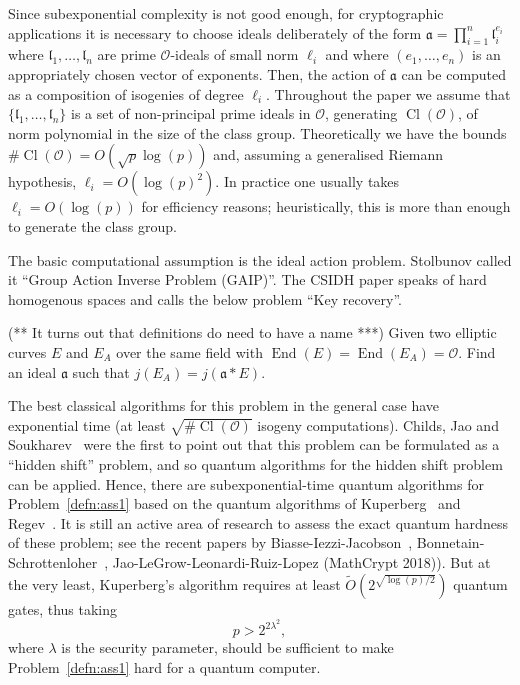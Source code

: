 \documentclass{llncs}
\newcommand{\OO}{\mathcal{O}}
\DeclareMathOperator{\End}{End}
\DeclareMathOperator{\Cl}{Cl}
\renewcommand{\a}{\mathfrak{a}}
\renewcommand{\l}{\mathfrak{l}}
\begin{document}
Since subexponential complexity is not good enough, for cryptographic applications it is necessary to choose ideals deliberately of the form $\a = \prod_{i=1}^n \l_i^{e_i}$ where $\l_1, \dots, \l_n$ are prime $\OO$-ideals of small norm $\ell_i$ and where $(e_1, \dots, e_n)$ is an appropriately chosen vector of exponents.
Then, the action of $\a$ can be computed as a composition of isogenies of degree $\ell_i$.
Throughout the paper we assume that $\{ \l_1, \dots, \l_n \}$ is a set of non-principal prime ideals in $\OO$, generating $\Cl(\OO)$, of norm polynomial in the size of the class group.
Theoretically we have the bounds $\#\Cl(\OO) = O( \sqrt{p} \log(p) )$ and, assuming a generalised Riemann hypothesis, $\ell_i = O( \log(p)^2 )$.
In practice one usually takes $\ell_i=O(\log(p))$ for efficiency reasons; heuristically, this is more than enough to generate the class group.

The basic computational assumption is the ideal action problem.
Stolbunov called it ``Group Action Inverse Problem (GAIP)''.
The CSIDH paper speaks of hard homogenous spaces and calls the below problem ``Key recovery''.

\begin{problem}\label{defn:ass1}
(** It turns out that definitions do need to have a name ***)
Given two elliptic curves $E$ and $E_A$ over the same field with $\End(E) = \End(E_A) = \OO$. Find an ideal $\a$ such that $j( E_A ) = j( \a * E )$.
\end{problem}

The best classical algorithms for this problem in the general case have exponential time (at least $\sqrt{ \# \Cl( \OO ) }$ isogeny computations).
Childs, Jao and Soukharev~\cite{childs2014constructing} were the first to point out that this problem can be formulated as a ``hidden shift'' problem, and so quantum algorithms for the hidden shift problem can be applied.
Hence, there are subexponential-time quantum algorithms for Problem~\ref{defn:ass1} based on the quantum algorithms of Kuperberg~\cite{Kup} and Regev~\cite{regev04}. 
It is still an active area of research to assess the exact quantum hardness of these problem; see the recent papers by Biasse-Iezzi-Jacobson~\cite{BIJ18}, Bonnetain-Schrottenloher~\cite{BS18}, Jao-LeGrow-Leonardi-Ruiz-Lopez (MathCrypt 2018)).
But at the very least, Kuperberg's algorithm requires at least $\tilde{O}( 2^{\sqrt{\log(p)/2}} )$ quantum gates, thus taking 
\begin{equation} \label{con1}
   p>2^{2\lambda^2},
\end{equation}
where $\lambda$ is the security parameter,
should be sufficient to make Problem~\ref{defn:ass1} hard for a quantum computer.
\end{document}
